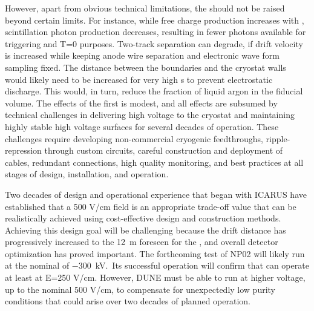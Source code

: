 However, apart from obvious technical limitations, the \efield should not be raised beyond certain limits. For instance, while free charge production increases with \efield, scintillation photon production decreases, resulting in fewer photons available for triggering and T=0 purposes. Two-track separation can degrade, if drift velocity is increased while keeping anode wire separation and electronic wave form sampling fixed. The distance between the  boundaries and the cryostat walls would likely need to be increased for very high \efield{}s to prevent electrostatic discharge. This would, in turn, reduce the fraction of liquid argon in the fiducial volume. The effects of the first is modest, and all effects are subsumed by technical challenges in delivering high voltage to the cryostat and maintaining highly stable high voltage surfaces for several decades of operation. These challenges require developing non-commercial cryogenic  feedthroughs,  ripple-repression through custom   circuits, careful construction and deployment of  cables, redundant  connections, high quality monitoring, and best practices at all stages of design, installation, and operation.

Two decades of design and operational experience that began with ICARUS have established that a 500 V/cm field is an appropriate trade-off value that can be realistically achieved using cost-effective design and construction methods. Achieving this design goal will be challenging because the drift distance has progressively increased to the \SI{12}{m} foreseen for the , and overall detector optimization has proved important. 
The forthcoming test of  NP02 will likely run at the nominal  of \SI{-300}{kV}.\  Its successful operation will confirm that   can operate  at least at E=250 V/cm.
However, DUNE must be able to run at higher voltage, up to the nominal 500 V/cm, to compensate for unexpectedly low purity conditions that could arise over two decades of planned operation.

